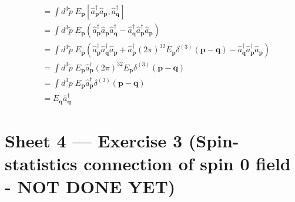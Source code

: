 \documentclass[10pt,a4paper]{report}
\theoremstyle{definition}
\begin{document}
\begin{enumerate}[a)]
\begin{align}
[\hat{H},\hat{a}^\dagger_\mathbf{q}]
&=\int d^3\tilde{p}\;E_\mathbf{p}
[\hat{a}^\dagger_\mathbf{p}\hat{a}_\mathbf{p},\hat{a}^\dagger_\mathbf{q}]\\
&=\int d^3\tilde{p}\;E_\mathbf{p}
(\hat{a}^\dagger_\mathbf{p}\hat{a}_\mathbf{p}\hat{a}^\dagger_\mathbf{q}-\hat{a}^\dagger_\mathbf{q}\hat{a}^\dagger_\mathbf{p}\hat{a}_\mathbf{p})\\
&=\int d^3\tilde{p}\;E_\mathbf{p}
(\hat{a}^\dagger_\mathbf{p}\hat{a}^\dagger_\mathbf{q}\hat{a}_\mathbf{p}+\hat{a}^\dagger_\mathbf{p}(2\pi)^32E_\mathbf{p}\delta^{(3)}(\mathbf{p}-\mathbf{q})-\hat{a}^\dagger_\mathbf{q}\hat{a}^\dagger_\mathbf{p}\hat{a}_\mathbf{p})\\
&=\int d^3\tilde{p}\;E_\mathbf{p}
\hat{a}^\dagger_\mathbf{p}(2\pi)^32E_\mathbf{p}\delta^{(3)}(\mathbf{p}-\mathbf{q})\\
&=\int d^3p\;E_\mathbf{p}
\hat{a}^\dagger_\mathbf{p}\delta^{(3)}(\mathbf{p}-\mathbf{q})\\
&=E_\mathbf{q}\hat{a}^\dagger_\mathbf{q}
\end{align}


\end{enumerate}


\section{Sheet 4 — Exercise 3 (Spin-statistics connection of spin 0 field - NOT DONE YET)}
\end{document}
